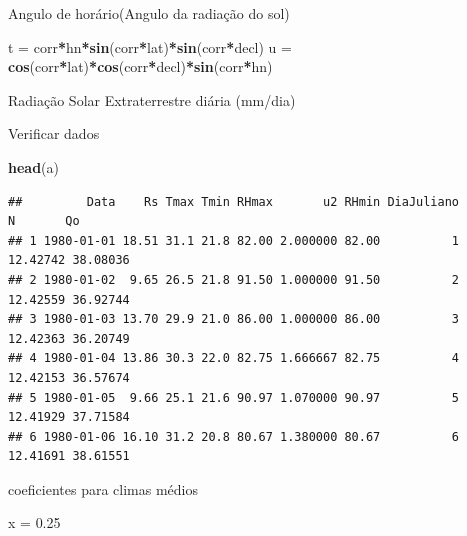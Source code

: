 \documentclass[
]{book}
\newenvironment{Shaded}{\begin{snugshade}}{\end{snugshade}}
\newcommand{\FloatTok}[1]{\textcolor[rgb]{0.00,0.00,0.81}{#1}}
\newcommand{\KeywordTok}[1]{\textcolor[rgb]{0.13,0.29,0.53}{\textbf{#1}}}
\newcommand{\NormalTok}[1]{#1}
\newcommand{\OperatorTok}[1]{\textcolor[rgb]{0.81,0.36,0.00}{\textbf{#1}}}
\newcommand{\StringTok}[1]{\textcolor[rgb]{0.31,0.60,0.02}{#1}}
\begin{document}
Angulo de horário(Angulo da radiação do sol)

\begin{Shaded}
\begin{Highlighting}[]
\NormalTok{t =}\StringTok{ }\NormalTok{corr}\OperatorTok{*}\NormalTok{hn}\OperatorTok{*}\KeywordTok{sin}\NormalTok{(corr}\OperatorTok{*}\NormalTok{lat)}\OperatorTok{*}\KeywordTok{sin}\NormalTok{(corr}\OperatorTok{*}\NormalTok{decl) }
\NormalTok{u =}\StringTok{ }\KeywordTok{cos}\NormalTok{(corr}\OperatorTok{*}\NormalTok{lat)}\OperatorTok{*}\KeywordTok{cos}\NormalTok{(corr}\OperatorTok{*}\NormalTok{decl)}\OperatorTok{*}\KeywordTok{sin}\NormalTok{(corr}\OperatorTok{*}\NormalTok{hn)}
\end{Highlighting}
\end{Shaded}

Radiação Solar Extraterrestre diária (mm/dia)

\begin{Shaded}
\end{Shaded}

Verificar dados

\begin{Shaded}
\begin{Highlighting}[]
\KeywordTok{head}\NormalTok{(a)}
\end{Highlighting}
\end{Shaded}

\begin{verbatim}
##         Data    Rs Tmax Tmin RHmax       u2 RHmin DiaJuliano        N       Qo
## 1 1980-01-01 18.51 31.1 21.8 82.00 2.000000 82.00          1 12.42742 38.08036
## 2 1980-01-02  9.65 26.5 21.8 91.50 1.000000 91.50          2 12.42559 36.92744
## 3 1980-01-03 13.70 29.9 21.0 86.00 1.000000 86.00          3 12.42363 36.20749
## 4 1980-01-04 13.86 30.3 22.0 82.75 1.666667 82.75          4 12.42153 36.57674
## 5 1980-01-05  9.66 25.1 21.6 90.97 1.070000 90.97          5 12.41929 37.71584
## 6 1980-01-06 16.10 31.2 20.8 80.67 1.380000 80.67          6 12.41691 38.61551
\end{verbatim}

coeficientes para climas médios

\begin{Shaded}
\begin{Highlighting}[]
\NormalTok{x =}\StringTok{ }\FloatTok{0.25}
\end{Highlighting}
\end{Shaded}
\end{document}
